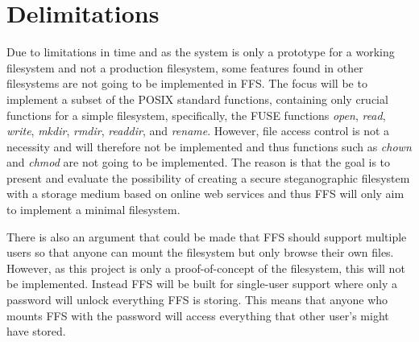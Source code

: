 \section{Delimitations} %

Due to limitations in time and as the system is only a prototype for a working filesystem and not a production filesystem, some features found in other filesystems are not going to be implemented in FFS. The focus will be to implement a subset of the POSIX standard functions, containing only crucial functions for a simple filesystem, specifically, the FUSE functions \textit{open}, \textit{read}, \textit{write}, \textit{mkdir}, \textit{rmdir}, \textit{readdir}, and \textit{rename}. However, file access control is not a necessity and will therefore not be implemented and thus functions such as \textit{chown} and \textit{chmod} are not going to be implemented. The reason is that the goal is to present and evaluate the possibility of creating a secure steganographic filesystem with a storage medium based on online web services and thus FFS will only aim to implement a minimal filesystem. 

There is also an argument that could be made that FFS should support multiple users so that anyone can mount the filesystem but only browse their own files. However, as this project is only a proof-of-concept of the filesystem, this will not be implemented. Instead FFS will be built for single-user support where only a password will unlock everything FFS is storing. This means that anyone who mounts FFS with the password will access everything that other user's might have stored.